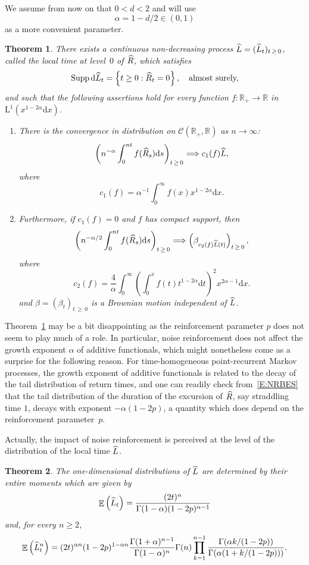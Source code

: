 \documentclass[10pt]{amsart}
\newtheorem{theo}{Theorem}[section]
\theoremstyle{definition}\newtheorem{defi}[theo]{Definition}\newtheorem{rema}[theo]{Remark}\newtheorem{exam}[theo]{Example}\newtheorem{exem}[theo]{Example}\newtheorem{nota}[theo]{Notation}
\renewcommand{\hat}[1]{\widehat{#1}}
\newcommand{\dd}{\mathrm{d}}
\newcommand{\rmL}{\mathrm{L}}
\newcommand{\Supp}{\mathrm{Supp}}
\DeclareMathOperator{\E}{\mathbb{E}}
\newcommand{\R}{\mathbb{R}}
\newcommand{\calC}{\mathcal{C}}
\newcommand*{\romanenumi}{\renewcommand*{\theenumi}{\roman{enumi}}}
\let\oldhat\hat
\renewcommand*{\hat}[1]{\mathchoice{\widehat{#1}}{\widehat{#1}}{\oldhat{#1}}{\oldhat{#1}}}
\begin{document}
We assume from now on that $0<d<2$ and will use
\[
\alpha= 1-d/2 \in(0,1)
\]
as a more convenient parameter.

\begin{theo}\label{T1}
There exists a continuous non-decreasing process $\hat{L} = (\hat{L}_t)_{t\,\geq\,0}$, called the local time at level~$0$ of $\hat R$, which satisfies
\[
\Supp\, \dd \hat{L}_t =\left\{t\geq0: \hat R_t=0\right\}, \quad \text{almost surely,}
\]
and such that the following assertions hold for every function $f: \R_+\to \R$ in $ \rmL^1(x^{1-2\alpha} \dd x)$.
\begin{enumerate}\romanenumi
\item \label{theo1.1.i}
There is the convergence in distribution on $\calC(\R_+,\R)$ as $n\to \infty$:
\[
\left(n^{-\alpha} \int_0^{nt} f(\hat R_s) \dd s\right)_{t\,\geq\,0} \Longrightarrow c_1(f)\hat{L},
\]
where
\[
c_1(f)= \alpha^{-1} \int_0^{\infty} f(x) x^{1-2\alpha} \dd x.
\]

\item\label{theo1.1.ii} Furthermore, if $c_1(f)=0$ and $f$ has compact support, then
\[
\left(n^{-\alpha/2} \int_0^{nt} f(\hat R_s) \dd s\right)_{t\,\geq\,0} \Longrightarrow \left(\beta_{c_2(f)\hat{L}(t)}\right)_{t\,\geq\,0},
\]
where
\[
c_2(f)= \frac{4}{\alpha} \int_0^{\infty} \left(\int_{0}^{x} f(t) t^{1-2\alpha} \dd t \right)^2 x^{2\alpha-1}\dd x.
\]
and $\beta = (\beta_t)_{t\,\geq\,0}$ is a Brownian motion independent of $\hat{L}$.
\end{enumerate}
\end{theo}

Theorem~\ref{T1} may be a bit disappointing as the reinforcement parameter $p$ does not seem to play much of a role. In particular, noise reinforcement does not affect the growth exponent $\alpha$ of additive functionals, which might nonetheless come as a surprise for the following reason. For time-homogeneous point-recurrent Markov processes, the growth exponent of additive functionals is related to the decay of the tail distribution of return times, and one can readily check from~\eqref{E:NRBES} that the tail distribution of the duration of the excursion of $\hat R$, say straddling time $1$, decays with exponent $-\alpha(1-2p)$, a quantity which does depend on the reinforcement parameter~$p$.


Actually, the impact of noise reinforcement is perceived at the level of the distribution of the local time $\hat{L}$.


\begin{theo}\label{T2}
The one-dimensional distributions of $\hat{L}$ are determined by their entire moments which are given by
\[
\E\left(\hat{L}_t\right)=\frac{(2t)^{\alpha }}{\Gamma(1-\alpha) (1-2p)^{\alpha -1}}
\]
and, for every $n\geq 2$,
\[
\E\left(\hat{L}_t^n\right)= (2t)^{\alpha n} (1-2p)^{1-\alpha n}
\frac{\Gamma(1+\alpha)^{n-1}}{ \Gamma(1-\alpha)^n} \Gamma(n)
\prod_{k=1}^{n-1} \frac{\Gamma(\alpha k/(1-2p))}{\Gamma(\alpha(1+k/(1-2p)))}.
\]
\end{theo}
\end{document}
